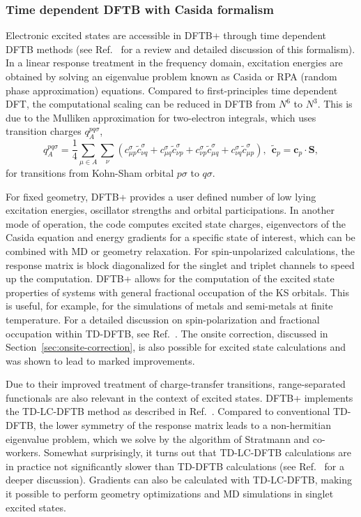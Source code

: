 \documentclass{revtex4-1}
\newcommand{\dftbp}{DFTB+}
\begin{document}
\subsubsection{Time dependent DFTB with Casida formalism}
\label{sec:TD-DFTB}

Electronic excited states are accessible in \dftbp{} through time dependent DFTB
methods (see Ref.~ for a review and detailed
discussion of this formalism). In a linear response treatment in the
frequency domain, excitation energies are obtained by solving an eigenvalue
problem known as Casida or RPA (random phase approximation)
equations. Compared to first-principles time dependent DFT, the computational
scaling can be reduced in DFTB from $N^6$ to $N^3$. This is due to the Mulliken
approximation for two-electron integrals,\cite{Niehaus2001a} which uses
transition charges $q^{pq\sigma}_A$,
\begin{equation}
  \label{qia}
  q_{A}^{pq\sigma} = \frac{1}{4} \sum_{\mu \in A}\sum_\nu  \left( c_{\mu
      p}^{\sigma} \tilde{c}_{\nu q}^{\sigma} +  c_{\mu q}^{\sigma}
    \tilde{c}_{\nu p}^{\sigma} + c_{\nu p}^{\sigma} \tilde{c}_{\mu
      q}^{\sigma} + c_{\nu q}^{\sigma} \tilde{c}_{\mu p}^{\sigma}
  \right), ~~ \tilde{\mathbf{c}}_p =  \mathbf{c}_p\cdot\mathbf{S},
\end{equation}
for transitions from Kohn-Sham orbital $p\sigma$ to $q\sigma$.

For fixed geometry, \dftbp{} provides a user defined number of low lying
excitation energies, oscillator strengths and orbital participations.  In
another mode of operation, the code computes excited state charges, eigenvectors
of the Casida equation and energy gradients for a specific state of interest,
which can be combined with MD or geometry relaxation. For spin-unpolarized
calculations, the response matrix is block diagonalized for the singlet and
triplet channels to speed up the computation.  \dftbp{} allows for the
computation of the excited state properties of systems with general fractional
occupation of the KS orbitals. This is useful, for example, for the simulations
of metals and semi-metals at finite temperature. For a detailed discussion on
spin-polarization and fractional occupation within TD-DFTB, see
Ref.~. The onsite correction, discussed in
Section~\ref{sec:onsite-correction}, is also possible for excited state
calculations and was shown to lead to marked improvements.\cite{Dominguez2013}

Due to their improved treatment of charge-transfer transitions, range-separated
functionals are also relevant in the context of excited states. \dftbp{} implements
the TD-LC-DFTB method as described in Ref.~. Compared to
conventional TD-DFTB, the lower symmetry of the response matrix leads to a
non-hermitian eigenvalue problem, which we solve by the algorithm
of Stratmann and co-workers.\cite{Stratmann1998} Somewhat
surprisingly, it turns out that TD-LC-DFTB calculations are in practice not
significantly slower than TD-DFTB calculations (see Ref.~
for a deeper discussion). Gradients can also be calculated with TD-LC-DFTB,
making it possible to perform geometry optimizations and MD simulations in
singlet excited states.
\end{document}
